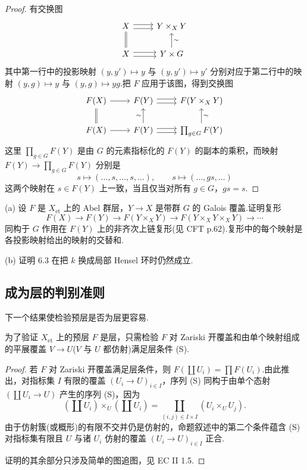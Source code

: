 \begin{proof}
有交换图
\[
\begin{tikzcd}
X \arrow[r, shift left] \arrow[r, shift right] & Y \times_{X} Y \\
X \arrow[u, equal] \arrow[r, shift left] \arrow[r, shift right] & Y \times G \arrow[u, "\sim"']
\end{tikzcd}
\]
其中第一行中的投影映射 $(y, y') \mapsto y$ 与 $(y, y') \mapsto y'$ 分别对应于第二行中的映射 $(y, g) \mapsto y$ 与 $(y, g) \mapsto yg$.把 $F$ 应用于该图，得到交换图
\[
\begin{tikzcd}
F(X) \arrow[r] & F(Y) \arrow[r, shift left] \arrow[r, shift right] & F(Y \times_{X} Y) \\
F(X) \arrow[u, equal] \arrow[r] & F(Y) \arrow[u, "\sim"] \arrow[r, shift left] \arrow[r, shift right] & \prod_{g \in G} F(Y) \arrow[u, "\sim"']
\end{tikzcd}
\]
这里 $\prod_{g \in G} F(Y)$ 是由 $G$ 的元素指标化的 $F(Y)$ 的副本的乘积，而映射 $F(Y) \to \prod_{g \in G} F(Y)$ 分别是
\[
s \mapsto (\ldots, s, \ldots, s, \ldots), \qquad s \mapsto (\ldots, gs, \ldots)
\]
这两个映射在 $s \in F(Y)$ 上一致，当且仅当对所有 $g \in G$，$gs = s$.
\end{proof}

\begin{exercise}\label{exc:6.5}
(a) 设 $F$ 是 $X_{\mathrm{et}}$ 上的 Abel 群层，$Y \to X$ 是带群 $G$ 的 Galois 覆盖.证明复形
\[
F(X) \to F(Y) \to F(Y \times_{X} Y) \to F(Y \times_{X} Y \times_{X} Y) \to \cdots
\]
同构于 $G$ 作用在 $F(Y)$ 上的非齐次上链复形(见 CFT p.62).复形中的每个映射是各投影映射给出的映射的交替和.

(b) 证明 6.3 在把 $k$ 换成局部 Hensel 环时仍然成立.
\end{exercise}

\subsection*{成为层的判别准则}

下一个结果使检验预层是否为层更容易.

\begin{proposition}\label{prop:6.6}
为了验证 $X_{\mathrm{et}}$ 上的预层 $F$ 是层，只需检验 $F$ 对 Zariski 开覆盖和由单个映射组成的平展覆盖 $V \to U$($V$ 与 $U$ 都仿射)满足层条件 (S).
\end{proposition}

\begin{proof}
若 $F$ 对 Zariski 开覆盖满足层条件，则 $F(\coprod U_i) = \prod F(U_i)$.由此推出，对指标集 $I$ 有限的覆盖 $(U_i \to U)_{i \in I}$，序列 (S) 同构于由单个态射 $(\coprod U_i \to U)$ 产生的序列 (S)，因为
\[
\left(\coprod U_i\right) \times_{U} \left(\coprod U_i\right) = \coprod_{(i,j) \in I \times I} \left( U_i \times_{U} U_j \right).
\]
由于仿射簇(或概形)的有限不交并仍是仿射的，命题叙述中的第二个条件蕴含 (S) 对指标集有限且 $U$ 与诸 $U_i$ 仿射的覆盖 $(U_i \to U)_{i \in I}$ 正合.

证明的其余部分只涉及简单的图追图，见 EC II 1.5.
\end{proof}

